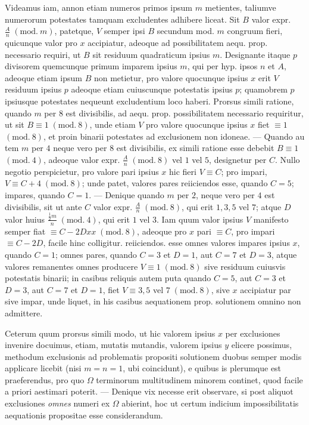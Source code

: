 Videamus iam, annon etiam numeros primos ipsum \(m\) metientes, taliumve numerorum potestates tamquam excludentes adhibere liceat. Sit \(B\) valor expr. \(\frac An\; (\mathrm{mod}.\ m)\), patetque, \(V\) semper ipsi \(B\) secundum mod. \(m\) congruum fieri, quicunque valor pro \(x\) accipiatur, adeoque ad possibilitatem aequ. prop. necessario requiri, ut \(B\) sit residuum quadraticum ipsius \(m\). Designante itaque \(p\) divisorem quemcunque primum imparem ipsius \(m\), qui per hyp. ipsos \(n\) et \(A\), adeoque etiam ipsum \(B\) non metietur, pro valore quocunque ipsius \(x\) erit \(V\) residuum ipsius \(p\) adeoque etiam cuiuscunque potestatis ipsius \(p\); quamobrem \(p\) ipsiusque potestates nequeunt excludentium loco haberi. Prorsus simili ratione, quando \(m\) per \(8\) est divisibilis, ad aequ. prop. possibilitatem necessario requiritur, ut sit \(B\equiv1\; (\mathrm{mod}.\ 8)\), unde etiam \(V\) pro valore quocunque ipsius \(x\) fiet \(\equiv1\) \((\mathrm{mod.}\ 8)\), et proin binarii potestates ad exclusionem non idoneae. — Quando au%
tem \(m\) per \(4\) neque vero per \(8\) est divisibilis, ex simili ratione esse debebit \(B\equiv1\) \((\mathrm{mod.}\ 4)\), adeoque valor expr. \(\frac An\; (\mathrm{mod}.\ 8)\) vel \(1\) vel \(5\), designetur per \(C\). Nullo negotio perspicietur, pro valore pari ipsius \(x\) hic fieri \(V\equiv C\); pro impari, \(V\equiv C+4\; (\mathrm{mod}.\ 8)\); unde patet, valores pares reiiciendos esse, quando \(C=5\); impares, quando \(C=1\). — Denique quando \(m\) per \(2\), neque vero per \(4\) est divisibilis, sit ut ante \(C\) valor expr. \(\frac An\; (\mathrm{mod}.\ 8)\), qui erit \(1,\allowbreak 3,\allowbreak 5\) vel \(7\); atque \(D\) valor huius \(\frac{\frac12m}{n}\; (\mathrm{mod}.\ 4)\), qui erit \(1\) vel \(3\). Iam quum valor ipsius \(V\) manifesto semper fiat \(\equiv C-2Dxx\; (\mathrm{mod}.\ 8)\), adeoque pro \(x\) pari \(\equiv C\), pro impari \(\equiv C-2D\), facile hinc colligitur. reiiciendos. esse omnes valores impares ipsius \(x\), quando \(C=1\); omnes pares, quando \(C=3\) et \(D=1\), aut \(C=7\) et \(D=3\), atque valores remanentes omnes producere \(V\equiv1\; (\mathrm{mod}.\ 8)\) sive residuum cuiusvis potestatis binarii; in casibus reliquis autem puta quando \(C=5\), aut \(C=3\) et \(D=3\), aut \(C=7\) et \(D=1\), fiet \(V\equiv3,\allowbreak 5\) vel \(7\; (\mathrm{mod}.\ 8)\), sive \(x\) accipiatur par sive impar, unde liquet, in his casibus aequationem prop. solutionem omnino non admittere.

Ceterum quum prorsus simili modo, ut hic valorem ipsius \(x\) per exclusiones invenire docuimus, etiam, mutatis mutandis, valorem ipsius \(y\) elicere possimus, methodum exclusionis ad problematis propositi solutionem duobus semper modis applicare licebit (nisi \(m=n=1\), ubi coincidunt), e quibus is plerumque est praeferendus, pro quo \(\Omega\) terminorum multitudinem minorem continet, quod facile a priori aestimari poterit. — Denique vix necesse erit observare, si post aliquot exclusiones \textit{omnes} numeri ex \(\Omega\) abierint, hoc ut certum indicium impossibilitatis aequationis propositae esse considerandum.

